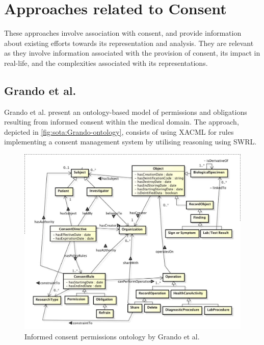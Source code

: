\section{Approaches related to Consent}\label{sec:sota:consent}
These approaches involve association with consent, and provide information about existing efforts towards its representation and analysis. They are relevant as they involve information associated with the provision of consent, its impact in real-life, and the complexities associated with its representations.

\subsection*{Grando et al.}
Grando et al. \cite{grando_ontological_2012} present an ontology-based model of permissions and obligations resulting from informed consent within the medical domain. The approach, depicted in \autoref{fig:sota:Grando-ontology}, consists of using XACML for rules implementing a consent management system by utilising reasoning using SWRL.
\begin{figure}[htbp]
    \centering
    \includegraphics[width=0.75\linewidth]{img/Grando_ontology.png}
    \caption{Informed consent permissions ontology by Grando et al. \cite{grando_ontological_2012}}
    \label{fig:sota:Grando-ontology}
\end{figure}


